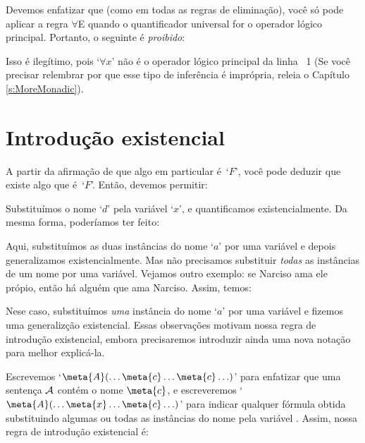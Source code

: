 Devemos enfatizar que (como em todas as regras de elimina\c c\~ao), voc\^e s\'o pode aplicar a regra $\forall$E quando o quantificador universal for o operador l\'ogico principal. Portanto, o seguinte \'e \emph{proibido}:
\begin{fitchproof}
\end{fitchproof}
Isso \'e ileg\'itimo, pois `$\forall x$' n\~ao \'e o  operador l\'ogico principal da linha ~1 (Se você precisar relembrar por que esse tipo de infer\^encia \'e impr\'opria, releia o  Capítulo \ref{s:MoreMonadic}).


\section{Introdu\c c\~ao existencial}
A partir da afirma\c c\~ao de que algo em particular \'e~`$F$', voc\^e pode deduzir que existe algo que \'e~`$F$'. Ent\~ao, devemos permitir:
\begin{fitchproof}
	 
\end{fitchproof}
 
Substitu\'imos o nome `$d$' pela vari\'avel `$x$',  e  quantificamos existencialmente. Da mesma forma,  poder\'iamos ter feito:
\begin{fitchproof}
	 
\end{fitchproof}
Aqui,  substitu\'imos as duas inst\^ancias do nome `$a$' por uma vari\'avel e depois generalizamos existencialmente. Mas n\~ao precisamos substituir  \emph{todas}  as inst\^ancias de um nome por  uma vari\'avel.  Vejamos outro exemplo: se Narciso ama ele pr\'opio, ent\~ao h\'a algu\'em que ama Narciso. Assim, temos:
\begin{fitchproof}
	 
\end{fitchproof}
Nese caso, substitu\'imos \emph{uma} inst\^ancia do nome `$a$' por uma vari\'avel   e  fizemos uma  generaliz\c c\~ao  existencial. Essas observa\c c\~oes motivam nossa regra de introdu\c c\~ao existencial,  embora  precisaremos introduzir ainda uma nova nota\c c\~ao  para melhor explic\'a-la.

Escrevemos  `$\meta{A}(\ldots \meta{c} \ldots \meta{c}\ldots)$' para enfatizar que uma senten\c ca
 $\mathcal{A}$ cont\'em o nome $\meta{c}$,  e escreveremos `$\meta{A}(\ldots \meta{x} \ldots \meta{c}\ldots)$' para indicar qualquer f\'ormula obtida substituindo algumas ou todas as inst\^ancias do nome   pela vari\'avel .  Assim, nossa regra de introdu\c c\~ao existencial \'e:
 
